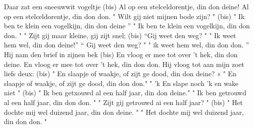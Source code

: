 \beginverse*
Daar zat een sneeuwwit vogeltje (bis)
Al op een stelceldorentje, din don deine!
Al op een stelceldorentje, din don don.
\endverse
\beginverse*
" Wilt gij niet mijnen bode zijn? " (bis)
" Ik ben te klein een vogelkijn, din don deine ” 
" Ik ben te klein een vogelkijn, din don don. "
\endverse
\beginverse*
" Zijt gij maar kleine, gij zijt snel; (bis)
“Gij weet den weg? " " Ik weet hem wel, din don deine!”
“ Gij weet den weg? " " ik weet hem wel, din don don. ”
\endverse
\beginverse*
Hij nam den brief in zijnen bek (bis)
En vloog er mee tot over 't hek, din don deine.
En vloog er mee tot over 't hek, din don don.
\endverse
\beginverse*
Hij vloog tot aan mijn zoet liefs deux: (bis)
" En slaapje of waakje, of zijt ge dood, din don deine? »
" En slaapje of waakje, of zijt ge dood, din don don."
\endverse
\beginverse*
" 'k En slape noch 'k en wake niet " (bis)
" Ik ben getxouwd al een half jaar, din don deine."
" Ik ben getrouwd al een half jaar, din don don. "
\endverse
\beginverse*
" Zijt gij getrouwd ai een half jaar? " (bis)
" Het dochte mij wel duizend jaar, din don deine. "
" Het dochte mij wel duizend jaar, din don don. "
\endverse
\endsong